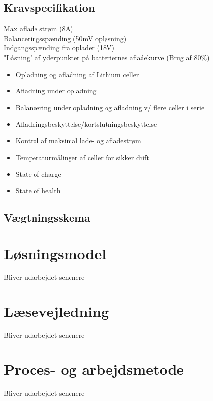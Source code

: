 \subsection{Kravspecifikation} \label{afs:kravspecifikation}
Max aflade strøm (8A) \\
Balanceringsspænding (50mV opløsning) \\
Indgangsspænding fra oplader (18V)\\
"Låsning" af yderpunkter på batteriernes afladekurve (Brug af 80\%)



\begin{itemize}
	\item Opladning og afladning af Lithium celler
	\item Afladning under opladning
	\item Balancering under opladning og afladning v/ flere celler i serie
	\item Afladningsbeskyttelse/kortslutningsbeskyttelse
	\item Kontrol af maksimal lade- og afladestrøm
	\item Temperaturmålinger af celler for sikker drift
	\item State of charge
	\item State of health
\end{itemize}

\subsection{Vægtningsskema}

\section{Løsningsmodel}
Bliver udarbejdet senenere

\section{Læsevejledning}
Bliver udarbejdet senenere

\section{Proces- og arbejdsmetode}
Bliver udarbejdet senenere
